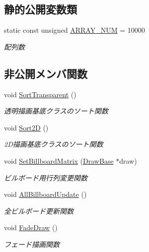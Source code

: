 \subsection*{静的公開変数類}
\begin{DoxyCompactItemize}
\item 
static const unsigned \mbox{\hyperlink{class_back_buffer_a28e89a0c543b6ae579c8ab75f9917059}{A\+R\+R\+A\+Y\+\_\+\+N\+UM}} = 10000
\begin{DoxyCompactList}\small\item\em 配列数 \end{DoxyCompactList}\end{DoxyCompactItemize}
\subsection*{非公開メンバ関数}
\begin{DoxyCompactItemize}
\item 
void \mbox{\hyperlink{class_back_buffer_af363b4d69affd48a1b0f65a000ff12b5}{Sort\+Transparent}} ()
\begin{DoxyCompactList}\small\item\em 透明描画基底クラスのソート関数 \end{DoxyCompactList}\item 
void \mbox{\hyperlink{class_back_buffer_a1530979126918a1a76b6555a5d9de9b8}{Sort2D}} ()
\begin{DoxyCompactList}\small\item\em 2\+D描画基底クラスのソート関数 \end{DoxyCompactList}\item 
void \mbox{\hyperlink{class_back_buffer_a5c9341c9d26576781ec9abb55b937bda}{Set\+Billboard\+Matrix}} (\mbox{\hyperlink{class_draw_base}{Draw\+Base}} $\ast$draw)
\begin{DoxyCompactList}\small\item\em ビルボード用行列変更関数 \end{DoxyCompactList}\item 
void \mbox{\hyperlink{class_back_buffer_a1b93b223c80549e7b11e1d91b56552bc}{All\+Billboard\+Update}} ()
\begin{DoxyCompactList}\small\item\em 全ビルボード更新関数 \end{DoxyCompactList}\item 
void \mbox{\hyperlink{class_back_buffer_a9835a5db9850f774a382c4f8e611b1d1}{Fade\+Draw}} ()
\begin{DoxyCompactList}\small\item\em フェード描画関数 \end{DoxyCompactList}\end{DoxyCompactItemize}
